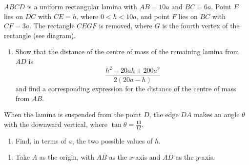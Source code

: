 \documentclass[leqno]{article}
\begin{document}
\begin{enumerate}[
  label=\textbf{\arabic*.},
  leftmargin=*,
  topsep=0pt,
  partopsep=0pt,
  parsep=0pt
]
\begin{figure}[H]
    \centering
{}
\end{figure}


$ABCD$ is a uniform rectangular lamina with $AB=10a$ and $BC=6a$. Point $E$ lies on $DC$ with $CE=h$, where $0<h<10a$, and point $F$ lies on $BC$ with $CF=3a$. The rectangle $CEGF$ is removed, where $G$ is the fourth vertex of the rectangle (see diagram). \\
\begin{enumerate}[label=\textbf{(\alph*)}]
  \item Show that the distance of the centre of mass of the remaining lamina from $AD$ is
  \[
  \dfrac{h^2-20ah+200a^2}{2(20a-h)}
  \]
  and find a corresponding expression for the distance of the centre of mass from $AB$.  \\
\end{enumerate}
When the lamina is suspended from the point $D$, the edge $DA$ makes an angle $\theta$ with the downward vertical, where $\tan\theta=\frac{13}{12}$. \\
\begin{enumerate}[label=\textbf{(\alph*)}, resume]
  \item Find, in terms of $a$, the two possible values of $h$.  \\
\end{enumerate}

\vspace*{10pt}

\begin{djsSolution}
\begin{enumerate}[label=\textbf{(\alph*)}, start=1]
  \item Take $A$ as the origin, with $AB$ as the $x$-axis and $AD$ as the $y$-axis.


\end{enumerate}
\end{djsSolution}
\end{enumerate}
\end{document}
